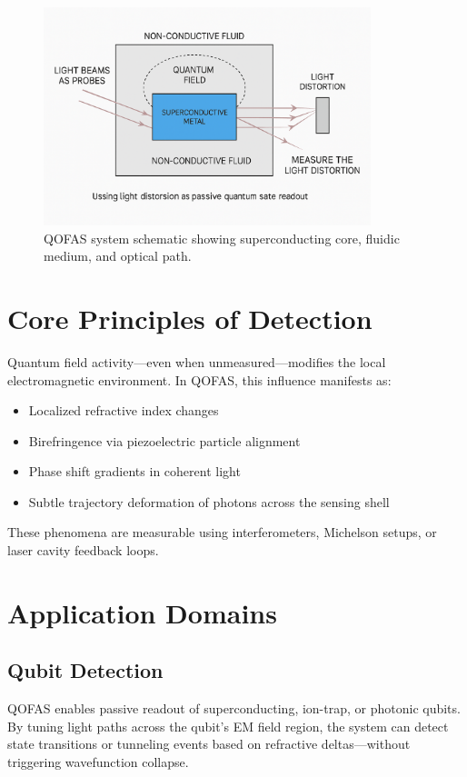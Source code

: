 \documentclass[11pt]{article}
\begin{document}
\begin{figure}[h!]
  \centering
  \includegraphics[width=0.85\textwidth]{images/qofas_schematic.png}
  \caption{QOFAS system schematic showing superconducting core, fluidic medium, and optical path.}
  \label{fig:qofas_schematic}
\end{figure}

\section{Core Principles of Detection}
Quantum field activity---even when unmeasured---modifies the local electromagnetic environment. In QOFAS, this influence manifests as:
\begin{itemize}
  \item Localized refractive index changes
  \item Birefringence via piezoelectric particle alignment
  \item Phase shift gradients in coherent light
  \item Subtle trajectory deformation of photons across the sensing shell
\end{itemize}
These phenomena are measurable using interferometers, Michelson setups, or laser cavity feedback loops.

\section{Application Domains}
\subsection{Qubit Detection}
QOFAS enables passive readout of superconducting, ion-trap, or photonic qubits. By tuning light paths across the qubit’s EM field region, the system can detect state transitions or tunneling events based on refractive deltas---without triggering wavefunction collapse.
\end{document}
